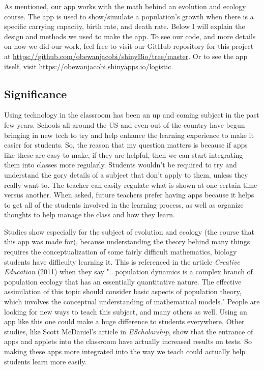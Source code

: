 \documentclass{article}\usepackage[]{graphicx}\usepackage[]{color}
\begin{document}
As mentioned, our app works with the math behind an evolution and ecology course. The app is used to show/simulate a population's growth when there is a specific carrying capacity, birth rate, and death rate. Below I will explain the design and methods we used to make the app. To see our code, and more details on how we did our work, feel free to visit our GitHub repository for this project at \url{https://github.com/obewanjacobi/shinyBio/tree/master}. Or to see the app itself, visit \url{https://obewanjacobi.shinyapps.io/logistic}.

\subsection{Significance}

Using technology in the classroom has been an up and coming subject in the past few years. Schools all around the US and even out of the country have begun bringing in new tech to try and help enhance the learning experience to make it easier for students. So, the reason that my question matters is because if apps like these are easy to make, if they are helpful, then we can start integrating them into classes more regularly. Students wouldn't be required to try and understand the gory details of a subject that don't apply to them, unless they really want to. The teacher can easily regulate what is shown at one certain time versus another. When asked, future teachers prefer having apps because it helps to get all of the students involved in the learning process, as well as organize thoughts to help manage the class and how they learn.

Studies show especially for the subject of evolution and ecology (the course that this app was made for), because understanding the theory behind many things requires the conceptualization of some fairly difficult mathematics, biology students have difficulty learning it. This is referenced in the article \textit{Creative Education} (2011) when they say "...population dynamics is a complex branch of population ecology that has an essentially quantitative nature. The effective assimilation of this topic should consider basic aspects of population theory, which involves the conceptual understanding of mathematical models." People are looking for new ways to teach this subject, and many others as well. Using an app like this one could make a huge difference to students everywhere. Other studies, like Scott McDaniel's article in \textit{EScholarship}, show that the entrance of apps and applets into the classroom have actually increased results on tests. So making these apps more integrated into the way we teach could actually help students learn more easily.
\end{document}
